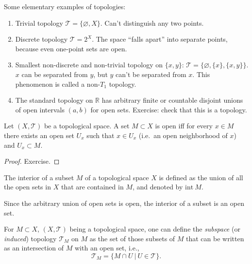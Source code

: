 \documentclass[english,letterpaper]{article}%
\numberwithin{equation}{section}
\numberwithin{figure}{section}
\numberwithin{table}{section}
\theoremstyle{definition}
\theoremstyle{definition}
\theoremstyle{definition}
\theoremstyle{plain}
\theoremstyle{plain}
\theoremstyle{plain}
\theoremstyle{plain}
\theoremstyle{remark}
\theoremstyle{remark}
\begin{document}
\begin{example} Some elementary examples of topologies:
\begin{enumerate}
    \item Trivial topology $\mathcal T=\{\varnothing,X\}$. Can't distinguish any two points.
    \item Discrete topology $\mathcal T=2^X$. The space ``falls apart'' into separate points, because even one-point sets are open.
    \item Smallest non-discrete and non-trivial topology on $\{x,y\}$: $\mathcal{T}=\{\varnothing,\{x\},\{x,y\}\}$. $x$ can be separated from $y$, but $y$ can't be separated from $x$. This phenomenon is called a non-$T_1$ topology.
    \item The standard topology on $\mathbb R$ has arbitrary finite or countable disjoint unions of open intervals $(a,b)$ for open sets. Exercise: check that this is a topology.
\end{enumerate}
\end{example}
\begin{prop}\label{open iff contains neighborhoods}
Let $(X,\mathcal{T})$ be a topological space. A set $M\subset X$ is open iff for every $x\in M$ there exists an open set $U_x$ such that $x\in U_x$ (i.e.\ an open neighborhood of $x$) and $U_x\subset M$.
\end{prop}
\begin{proof}
Exercise.
\end{proof}

\begin{defn}[Interior]
The interior of a subset $M$ of a topological space $X$ is defined as the union of all the open sets in $X$ that are contained in $M$, and denoted by $\text{int}~M$.
\end{defn}
Since the arbitrary union of open sets is open, the interior of a subset is an open set.

\begin{defn}
For $M\subset X$, $(X,\mathcal{T})$ being a topological space, one can define the \emph{subspace} (or \emph{induced}) topology $\mathcal{T}_M$ on $M$ as the set of those subsets of $M$ that can be written as an intersection of $M$ with an open set, i.e.,
\begin{equation}
    \mathcal{T}_M = \{ M\cap U ~|~ U\in \mathcal{T} \}.
\end{equation}
\end{defn}
\end{document}
